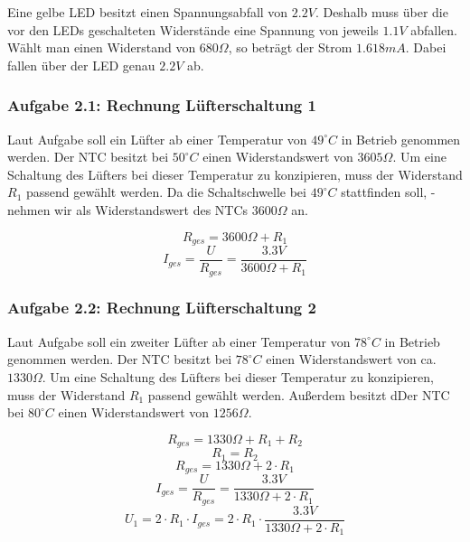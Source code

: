 \newpage

Eine gelbe LED besitzt einen Spannungsabfall von $2.2 V$. Deshalb muss über die vor den LEDs geschalteten Widerstände eine Spannung von jeweils $1.1 V$ abfallen. Wählt man einen Widerstand von $680 \Omega$, so beträgt der Strom $1.618 mA$. Dabei fallen über der LED genau $2.2 V$ ab. %

\subsubsection{Aufgabe 2.1: Rechnung Lüfterschaltung 1}

Laut Aufgabe soll ein Lüfter ab einer Temperatur von $49^{\circ} C$ in Betrieb genommen werden. Der NTC besitzt bei $50^{\circ} C$ einen Widerstandswert von $3605 \Omega$. Um eine Schaltung des Lüfters bei dieser Temperatur zu konzipieren, muss der Widerstand $R_1$ passend gewählt werden. Da die Schaltschwelle bei $49^{\circ} C$ stattfinden soll, -nehmen wir als Widerstandswert des NTCs $3600 \Omega$ an.

\[ R_{ges} = 3600 \Omega + R_1 \]
\[ I_{ges} = \frac{U}{R_{ges}} = \frac{3.3 V}{3600 \Omega + R_1} \]


\newpage
\subsubsection{Aufgabe 2.2: Rechnung Lüfterschaltung 2}

Laut Aufgabe soll ein zweiter Lüfter ab einer Temperatur von $78^{\circ} C$ in Betrieb genommen werden. Der NTC besitzt bei $78^{\circ} C$ einen Widerstandswert von ca. $1330 \Omega$. Um eine Schaltung des Lüfters bei dieser Temperatur zu konzipieren, muss der Widerstand $R_1$ passend gewählt werden. Außerdem besitzt dDer NTC bei $80^{\circ} C$ einen Widerstandswert von $1256 \Omega$.

\[ R_{ges} = 1330 \Omega + R_1 + R_2\]
\[ R_1 = R_2 \]
\[ R_{ges} = 1330 \Omega + 2 \cdot R_1 \]
\[ I_{ges} = \frac{U}{R_{ges}} = \frac{3.3 V}{1330 \Omega + 2 \cdot R_1} \]
\[ U_{1} = 2 \cdot R_1 \cdot I_{ges} = 2 \cdot R_1 \cdot \frac{3.3 V}{1330 \Omega + 2 \cdot R_1} \]

